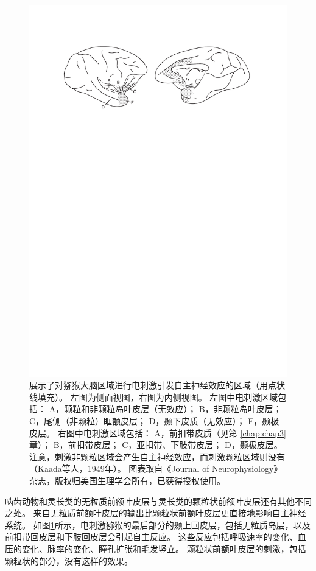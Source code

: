\begin{figure}[!htb]
	\centering
	\includegraphics[width=0.9\linewidth]{image_pfc/Fig_2_4}
	\caption{展示了对猕猴大脑区域进行电刺激引发自主神经效应的区域（用点状线填充）。
		左图为侧面视图，右图为内侧视图。
		左图中电刺激区域包括：
		A，颗粒和非颗粒岛叶皮层（无效应）；
		B，非颗粒岛叶皮层；
		C，尾侧（非颗粒）眶额皮层；
		D，颞下皮质（无效应）；
		F，颞极皮层。
		右图中电刺激区域包括：
		A，前扣带皮质（见第 \ref{chap:chap3} 章）；
		B，前扣带皮层；
		C，亚扣带、下肢带皮层；
		D，颞极皮层。
		注意，刺激非颗粒区域会产生自主神经效应，而刺激颗粒区域则没有（Kaada等人，1949年）。
		图表取自《Journal of  Neurophysiology》杂志，版权归美国生理学会所有，已获得授权使用。\label{fig:fig_2_4}}
\end{figure}


啮齿动物和灵长类的无粒质前额叶皮层与灵长类的颗粒状前额叶皮层还有其他不同之处。
来自无粒质前额叶皮层的输出比颗粒状前额叶皮层更直接地影响自主神经系统。
如图\ref{fig:fig_2_4}所示，电刺激猕猴的最后部分的颞上回皮层，包括无粒质岛层，以及前扣带回皮层和下肢回皮层会引起自主反应\cite{kaada1960cingulate}。
这些反应包括呼吸速率的变化、血压的变化、脉率的变化、瞳孔扩张和毛发竖立。
颗粒状前额叶皮层的刺激，包括颗粒状的部分，没有这样的效果\cite{kaada1949respiratory}。


